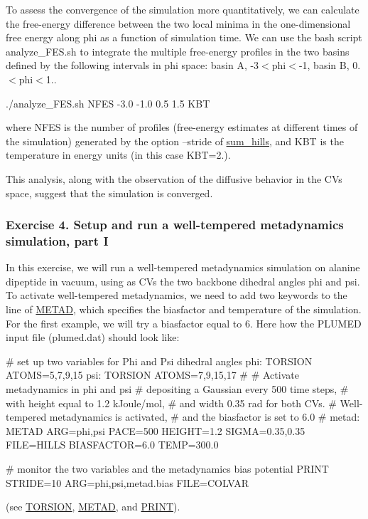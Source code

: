 \label{belfast-6_belfast-6-phifest-fig}%
\hypertarget{belfast-6_belfast-6-phifest-fig}{}%
 To assess the convergence of the simulation more quantitatively, we can calculate the free-\/energy difference between the two local minima in the one-\/dimensional free energy along phi as a function of simulation time. We can use the bash script analyze\+\_\+\+F\+E\+S.\+sh to integrate the multiple free-\/energy profiles in the two basins defined by the following intervals in phi space\+: basin A, -\/3$<$phi$<$-\/1, basin B, 0.$<$phi$<$1..

\begin{DoxyVerb}./analyze_FES.sh NFES -3.0 -1.0 0.5 1.5 KBT 
\end{DoxyVerb}


where N\+F\+E\+S is the number of profiles (free-\/energy estimates at different times of the simulation) generated by the option --stride of \hyperlink{sum_hills}{sum\+\_\+hills}, and K\+B\+T is the temperature in energy units (in this case K\+B\+T=2.).

\label{belfast-6_belfast-6-difft-fig}%
\hypertarget{belfast-6_belfast-6-difft-fig}{}%
 This analysis, along with the observation of the diffusive behavior in the C\+Vs space, suggest that the simulation is converged.\hypertarget{belfast-6_belfast-6-exercise-4}{}\subsubsection{Exercise 4. Setup and run a well-\/tempered metadynamics simulation, part I}\label{belfast-6_belfast-6-exercise-4}
In this exercise, we will run a well-\/tempered metadynamics simulation on alanine dipeptide in vacuum, using as C\+Vs the two backbone dihedral angles phi and psi. To activate well-\/tempered metadynamics, we need to add two keywords to the line of \hyperlink{METAD}{M\+E\+T\+A\+D}, which specifies the biasfactor and temperature of the simulation. For the first example, we will try a biasfactor equal to 6. Here how the P\+L\+U\+M\+E\+D input file (plumed.\+dat) should look like\+:

\begin{DoxyVerb}# set up two variables for Phi and Psi dihedral angles 
phi: TORSION ATOMS=5,7,9,15
psi: TORSION ATOMS=7,9,15,17
#
# Activate metadynamics in phi and psi
# depositing a Gaussian every 500 time steps,
# with height equal to 1.2 kJoule/mol,
# and width 0.35 rad for both CVs.
# Well-tempered metadynamics is activated,
# and the biasfactor is set to 6.0
#
metad: METAD ARG=phi,psi PACE=500 HEIGHT=1.2 SIGMA=0.35,0.35 FILE=HILLS BIASFACTOR=6.0 TEMP=300.0

# monitor the two variables and the metadynamics bias potential
PRINT STRIDE=10 ARG=phi,psi,metad.bias FILE=COLVAR\end{DoxyVerb}
 (see \hyperlink{TORSION}{T\+O\+R\+S\+I\+O\+N}, \hyperlink{METAD}{M\+E\+T\+A\+D}, and \hyperlink{PRINT}{P\+R\+I\+N\+T}).

